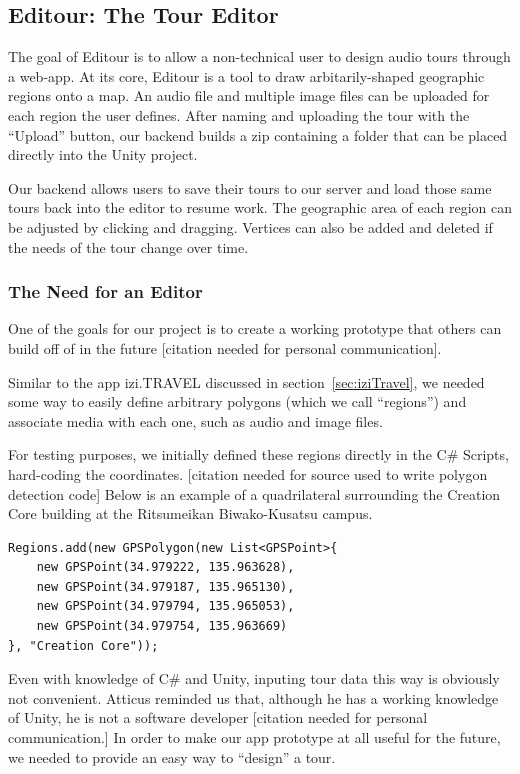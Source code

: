 \documentclass[a4paper, 10pt, american, titlepage]{article}
\begin{document}
\subsection{Editour: The Tour Editor}
\label{sec:editour}

The goal of Editour is to allow a non-technical user to design audio tours
through a web-app. At its core, Editour is a tool to draw arbitarily-shaped
geographic regions onto a map. An audio file and multiple image files can be
uploaded for each region the user defines. After naming and uploading the tour
with the ``Upload'' button, our backend builds a zip containing a folder that can
be placed directly into the Unity project.

Our backend allows users to save their tours to our server and load those same
tours back into the editor to resume work.  The geographic area of each region
can be adjusted by clicking and dragging. Vertices can also be added and
deleted if the needs of the tour change over time.

\subsubsection{The Need for an Editor}

One of the goals for our project is to create a working prototype that others
can build off of in the future [citation needed for personal communication].

Similar to the app izi.TRAVEL discussed in section~\ref{sec:iziTravel}, we
needed some way to easily define arbitrary polygons (which we call ``regions'')
and associate media with each one, such as audio and image files.

For testing purposes, we initially defined these regions directly in the C\#
Scripts, hard-coding the coordinates. [citation needed for source used to
write polygon detection code] Below is an example of a quadrilateral
surrounding the Creation Core building at the Ritsumeikan Biwako-Kusatsu
campus.

\begin{verbatim}
Regions.add(new GPSPolygon(new List<GPSPoint>{
    new GPSPoint(34.979222, 135.963628),
    new GPSPoint(34.979187, 135.965130),
    new GPSPoint(34.979794, 135.965053),
    new GPSPoint(34.979754, 135.963669)
}, "Creation Core"));
\end{verbatim}

Even with knowledge of C\# and Unity, inputing tour data this way is obviously
not convenient. Atticus reminded us that, although he has a working knowledge
of Unity, he is not a software developer [citation needed for personal
communication.] In order to make our app prototype at all useful for the
future, we needed to provide an easy way to ``design'' a tour.
\end{document}
